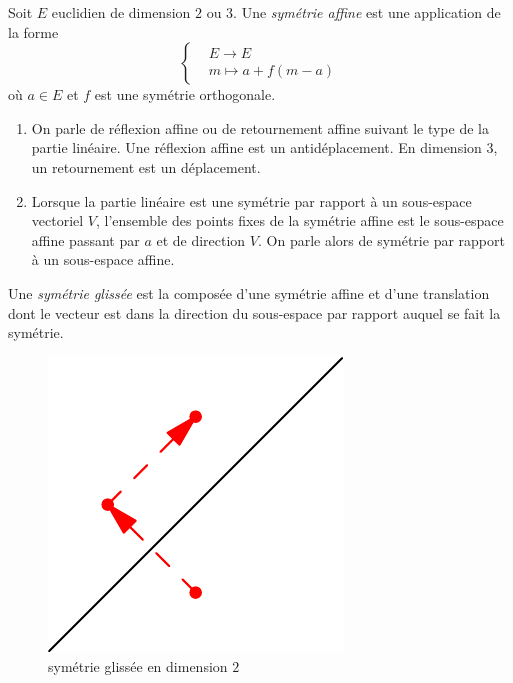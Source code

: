  \begin{defi}
 Soit $E$ euclidien de dimension $2$ ou $3$. Une \emph{symétrie affine} est une application de la forme
\begin{displaymath}
 \left\lbrace 
\begin{aligned}
 &E \rightarrow E \\
 &m \mapsto a+f(m-a)
\end{aligned}
\right. 
\end{displaymath}
où $a\in E$ et $f$ est une symétrie orthogonale.
\end{defi}
\begin{rems}
 \begin{enumerate}
  \item On parle de réflexion affine ou de retournement affine suivant le type de la partie linéaire. Une réflexion affine est un antidéplacement. En dimension $3$, un retournement est un déplacement.
  \item Lorsque la partie linéaire est une symétrie par rapport à un sous-espace vectoriel $V$, l'ensemble des points fixes de la symétrie affine est le sous-espace affine passant par $a$ et de direction $V$. On parle alors de symétrie par rapport à un sous-espace affine.
 \end{enumerate}
\end{rems}


\begin{defi}
Une \emph{symétrie glissée} est la composée d'une symétrie affine et d'une translation dont le vecteur est dans la direction du sous-espace par rapport auquel se fait la symétrie. 
\end{defi}
\begin{figure}[h!t]
 \centering
 \includegraphics{C5727_1.pdf}
 \caption{symétrie glissée en dimension $2$}
 \label{fig:C5727_1}
\end{figure}


